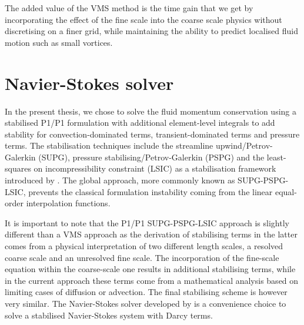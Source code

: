 The added value of the VMS method is the time gain that we get 
by incorporating the effect of the fine scale into the 
coarse scale physics without discretising on a finer grid, 
while maintaining the ability to predict localised fluid motion such as small vortices.
%
%
\section{Navier-Stokes solver}
In the present thesis, we chose to solve the fluid momentum conservation using a stabilised P1/P1 formulation with additional 
element-level integrals to add stability for convection-dominated terms, transient-dominated terms and pressure terms. 
The stabilisation techniques include the streamline upwind/Petrov-Galerkin (SUPG), pressure stabilising/Petrov-Galerkin (PSPG) and
the least-squares on incompressibility constraint (LSIC) as a stabilisation framework introduced by \citet{tezduyar_incompressible_1992}.
The global approach, more commonly known as SUPG-PSPG-LSIC, prevents the classical formulation instability coming from the 
linear equal-order interpolation functions.

It is important to note that the P1/P1 SUPG-PSPG-LSIC approach is slightly different than a VMS approach 
as the derivation of stabilising terms in the latter comes from a physical interpretation of two different 
length scales, a resolved coarse scale and an unresolved fine scale. The incorporation of the fine-scale equation
within the coarse-scale one results in additional stabilising terms, while in the current approach these terms
come from a mathematical analysis based on limiting cases of diffusion or advection. 
The final stabilising scheme is however very similar.
The Navier-Stokes solver developed by \citet{hachem_stabilized_2010,rivaux_simulation_2011} is a convenience choice 
to solve a stabilised Navier-Stokes system with Darcy terms. 

